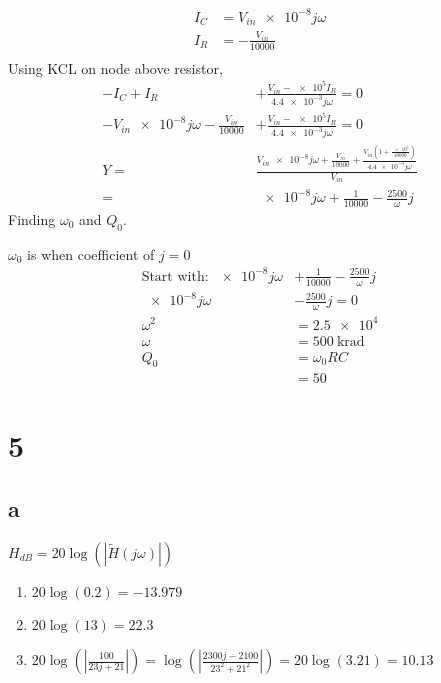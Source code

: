 \documentclass{article}
\begin{document}
\begin{multicols}{2}
    \begin{align*}
        I_C & = V_{in}\num{e-8}j\omega \\
        I_R & = -\frac{V_{in}}{10000}  \\
    \end{align*}
    Using KCL on node above resistor,
    \begin{align*}
        -I_C + I_R                                   & +\frac{V_{in} - \num{e5}I_R}{\num{4.4e-3}j\omega } = 0                                                                                 \\
        -V_{in}\num{e-8}j\omega-\frac{V_{in}}{10000} & +\frac{V_{in} - \num{e5}I_R}{\num{4.4e-3}j\omega} = 0                                                                                  \\
        Y =                                          & \frac{V_{in}\num{e-8}j\omega +\frac{V_{in}}{10000} +\frac{V_{in} \left( 1+\frac{\num{e5}}{10000}\right)}{\num{4.4e-3}j\omega}}{V_{in}} \\
        =                                            & \boxed{\num{e-8}j\omega +\frac{1}{10000} -\frac{2500}{\omega}j}
    \end{align*}
    Finding $\omega_0$ and $Q_0$.

    $\omega_0$ is when coefficient of $j = 0$
    \begin{align*}
        \text{Start with: }\num{e-8}j\omega & +\frac{1}{10000} -\frac{2500}{\omega}j \\
        \num{e-8}j\omega                    & -\frac{2500}{\omega}j = 0              \\
        \omega^2                            & = \num{2.5e4}                          \\
        \omega                              & = \boxed{\SI{500}{\kilo\radian}}       \\
        Q_0                                 & = \omega_0 R C                         \\
                                            & \boxed{= 50}
    \end{align*}
    \section*{5}
    \subsection*{a}
    $H_{dB} = 20 \log(|\tilde{H}(j\omega)|)$
    \begin{enumerate}
        \item $20 \log(0.2) = \boxed{-13.979}$
        \item $20 \log(13) = \boxed{22.3}$
        \item $20 \log(|\frac{100}{23j +21}|) = \log(|\frac{2300 j - 2100}{23^2+21^2}|) = 20 \log(3.21) = \boxed{10.13}$
    \end{enumerate}

\end{multicols}
\end{document}
